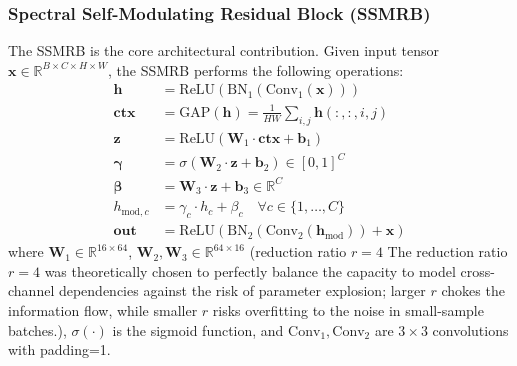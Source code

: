 \documentclass[conference]{IEEEtran}
\begin{document}
{\begin{table}[!t]
\caption{SMCNN Architecture Overview}
\label{tab:architecture}
\centering
{}
\end{table}

\subsubsection{Spectral Self-Modulating Residual Block (SSMRB)}

The SSMRB is the core architectural contribution. Given input tensor $\mathbf{x} \in \mathbb{R}^{B \times C \times H \times W}$, the SSMRB performs the following operations:
\begin{align}
\mathbf{h} &= \text{ReLU}(\text{BN}_1(\text{Conv}_1(\mathbf{x}))) \label{eq:ssmrb1} \\
\mathbf{ctx} &= \text{GAP}(\mathbf{h}) = \frac{1}{HW} \sum_{i,j} \mathbf{h}(:,:,i,j) \label{eq:ssmrb2} \\
\mathbf{z} &= \text{ReLU}(\mathbf{W}_1 \cdot \mathbf{ctx} + \mathbf{b}_1) \label{eq:ssmrb3} \\
\bm{\gamma} &= \sigma(\mathbf{W}_2 \cdot \mathbf{z} + \mathbf{b}_2) \in [0,1]^C \label{eq:ssmrb4} \\
\bm{\beta} &= \mathbf{W}_3 \cdot \mathbf{z} + \mathbf{b}_3 \in \mathbb{R}^C \label{eq:ssmrb5} \\
h_{\text{mod},c} &= \gamma_c \cdot h_c + \beta_c \quad \forall c \in \{1,\ldots,C\} \label{eq:ssmrb6} \\
\mathbf{out} &= \text{ReLU}(\text{BN}_2(\text{Conv}_2(\mathbf{h}_{\text{mod}})) + \mathbf{x}) \label{eq:ssmrb7}
\end{align}
where $\mathbf{W}_1 \in \mathbb{R}^{16 \times 64}$, $\mathbf{W}_2, \mathbf{W}_3 \in \mathbb{R}^{64 \times 16}$ (reduction ratio $r=4$ The reduction ratio $r=4$ was theoretically chosen to perfectly balance the capacity to model cross-channel dependencies against the risk of parameter explosion; larger $r$ chokes the information flow, while smaller $r$ risks overfitting to the noise in small-sample batches.), $\sigma(\cdot)$ is the sigmoid function, and $\text{Conv}_1, \text{Conv}_2$ are $3\!\times\!3$ convolutions with padding=1.

}
\end{document}
